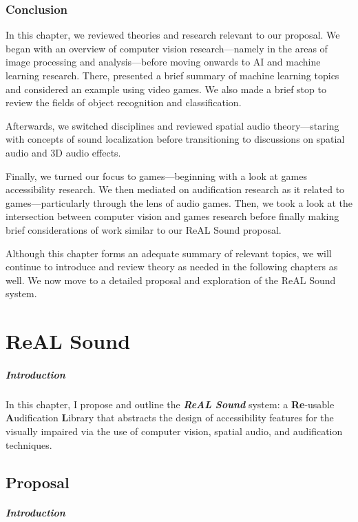 \documentclass{report}
\newcommand{\rs}{ReAL Sound\xspace}
\newcommand{\rsfull}{\textbf{Re}-usable \textbf{A}udification \textbf{L}ibrary\xspace}
\begin{document}
\subsection{Conclusion}
In this chapter, we reviewed theories and research relevant to our proposal. We began with an overview of computer vision research---namely in the areas of image processing and analysis---before moving onwards to AI and machine learning research. There, presented a brief summary of machine learning topics and considered an example using video games. We also made a brief stop to review the fields of object recognition and classification.  

Afterwards, we switched disciplines and reviewed spatial audio theory---staring with concepts of sound localization before transitioning to discussions on spatial audio and 3D audio effects. 

Finally, we turned our focus to games---beginning with a look at games accessibility research. We then mediated on audification research as it related to games---particularly through the lens of audio games. Then, we took a look at the intersection between computer vision and games research before finally making brief considerations of work similar to our \rs proposal.

Although this chapter forms an adequate summary of relevant topics, we will continue to introduce and review theory as needed in the following chapters as well. We now move to a detailed proposal and exploration of the \rs system.



\chapter{ReAL Sound}
\paragraph{Introduction}
In this chapter, I propose and outline the \textbf{\emph{\rs}} system: a \rsfull that abstracts the design of accessibility features for the visually impaired via the use of computer vision, spatial audio, and audification techniques.

\section{Proposal} 
\paragraph{Introduction} 
\end{document}
